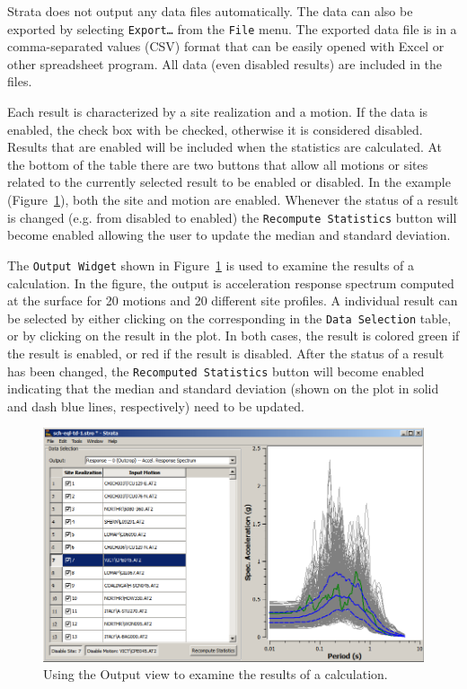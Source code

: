 \documentclass[11pt]{report}
\begin{document}
Strata does not output any data files automatically.   The data can also be exported by selecting
\texttt{Export\dots} from the \texttt{File} menu.  The exported data file is in a comma-separated
values (CSV) format that can be easily opened with Excel or other spreadsheet program.  All data
(even disabled results) are included in the files.

Each result is characterized by a site realization and a motion.  If the data is enabled, the check
box with be checked, otherwise it is considered disabled.  Results that are enabled will be included
when the statistics are calculated. At the bottom of the table there are two buttons that allow all
motions or sites related to the currently selected result to be enabled or disabled.  In the example
(Figure~\ref{fig:strata:outputWidget}), both the site and motion are enabled.  Whenever the status
of a result is changed (e.g. from disabled to enabled) the \texttt{Recompute Statistics} button will
become enabled allowing the user to update the median and standard deviation.

The \texttt{Output Widget} shown in Figure~\ref{fig:strata:outputWidget} is used to
examine the results of a calculation.  In the figure, the output is acceleration response spectrum
computed at the surface for 20 motions and 20 different site profiles.  A individual result can be
selected by either clicking on the corresponding in the \texttt{Data Selection} table, or by
clicking on the result in the plot.  In both cases, the result is colored green if the result is
enabled, or red if the result is disabled.  After the status of a result has been changed, the
\texttt{Recomputed Statistics} button will become enabled indicating that the median and standard
deviation (shown on the plot in solid and dash blue lines, respectively) need to be updated.  

\begin{figure}
  \begin{center}
	\includegraphics[scale=0.65]{figures/strata/outputWidget.png}
  \end{center}
  \caption{Using the Output view to examine the results of a calculation.}
  \label{fig:strata:outputWidget}
\end{figure}
\end{document}
